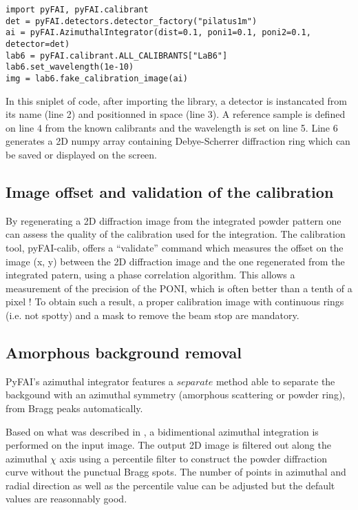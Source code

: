 \documentclass[preprint]{iucr}
\begin{document}
\begin{verbatim}
import pyFAI, pyFAI.calibrant
det = pyFAI.detectors.detector_factory("pilatus1m")
ai = pyFAI.AzimuthalIntegrator(dist=0.1, poni1=0.1, poni2=0.1, detector=det)
lab6 = pyFAI.calibrant.ALL_CALIBRANTS["LaB6"]
lab6.set_wavelength(1e-10)
img = lab6.fake_calibration_image(ai)
\end{verbatim}

In this sniplet of code, after importing the library, a detector is instancated
from its name (line 2) and positionned in space (line 3).
A reference sample is defined on line 4 from the known calibrants and the
wavelength is set on line 5. Line 6 generates a 2D numpy array containing
Debye-Scherrer diffraction ring which can be saved or displayed on the screen.

\subsection{Image offset and validation of the calibration}
By regenerating a 2D diffraction image from the integrated powder pattern one
can assess the quality of the calibration used for the integration.
The calibration tool, pyFAI-calib, offers  a ``validate'' command which measures
the offset on the image (x, y) between the 2D diffraction image and the one
regenerated from the integrated patern, using a phase correlation algorithm.
This allows a measurement of the precision of the PONI, which is often better
than a tenth of a pixel !
To obtain such a result, a proper calibration image with continuous rings (i.e.
not spotty) and a mask to remove the beam stop are mandatory.

\subsection{Amorphous background removal}

PyFAI's azimuthal integrator features a $separate$ method able to separate
the backgound with an azimuthal symmetry (amorphous scattering or powder ring),
from Bragg peaks automatically.

Based on what was described in \cite{PyFAI_PDJ}, a bidimentional azimuthal
integration is performed on the input image.
The output 2D image is filtered out along the azimuthal $\chi$ axis using a
percentile filter to construct the powder diffraction curve without the punctual
Bragg spots.
The number of points in azimuthal and radial direction as well as
the percentile value can be adjusted but the default values are reasonnably
good.
\end{document}
